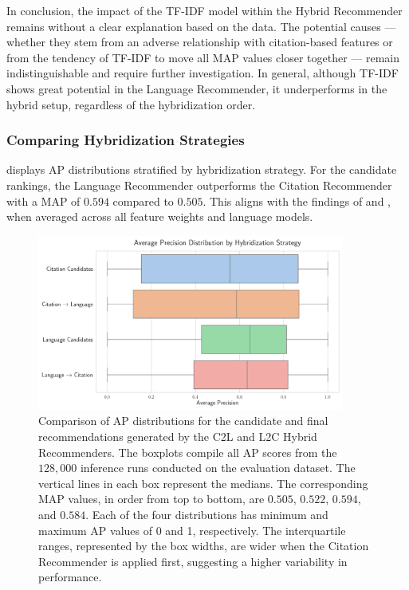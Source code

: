 In conclusion, the impact of the TF-IDF model within the Hybrid Recommender remains without a clear explanation based on the data. The potential causes — whether they stem from an adverse relationship with citation-based features or from the tendency of TF-IDF to move all \ac{MAP} values closer together — remain indistinguishable and require further investigation.
In general, although TF-IDF shows great potential in the Language Recommender, it underperforms in the hybrid setup, regardless of the hybridization order.


\subsubsection*{Comparing Hybridization Strategies}

 displays \ac{AP} distributions stratified by hybridization strategy.
For the candidate rankings, the Language Recommender outperforms the Citation Recommender with a \ac{MAP} of $0.594$ compared to $0.505$.
This aligns with the findings of  and , when averaged across all feature weights and language models.

\begin{figure}[htb!]
    \centering
    \includegraphics[width=0.9\textwidth]{plots/hybridization_strategies_boxplot.png}
    \caption[Evaluation of Hybridization Strategies]{Comparison of \ac{AP} distributions for the candidate and final recommendations generated by the \ac{C2L} and \ac{L2C} Hybrid Recommenders. The boxplots compile all \ac{AP} scores from the $128,000$ inference runs conducted on the evaluation dataset.
        The vertical lines in each box represent the medians. The corresponding \ac{MAP} values, in order from top to bottom, are $0.505$, $0.522$, $0.594$, and $0.584$. Each of the four distributions has minimum and maximum \ac{AP} values of 0 and 1, respectively. The interquartile ranges, represented by the box widths, are wider when the Citation Recommender is applied first, suggesting a higher variability in performance.}
    \label{fig:hybridization-strategies}
\end{figure}

